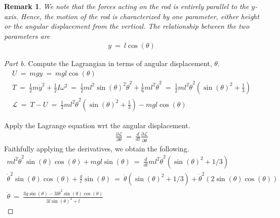\documentclass{article}
\numberwithin{equation}{section}
\newcommand{\deriv}[2]{
\frac {d {#1} } {d {#2}}
}
\newcommand{\pderiv}[2]{
\frac {\partial {#1} } {\partial {#2}}
}
\newtheorem{remark}{Remark}
\begin{document}
\begin{remark}
    We note that the forces acting on the rod is entirely parallel 
    to the $y$-axis. Hence, the motion of the rod is characterized 
    by one parameter, either height or the angular displacement from the vertical. 
    The relationship between the two parameters are 
    \begin{align}
        y \ = \ l \cos(\theta)
    \end{align}
\end{remark}

\begin{proof}[Part b]
    Compute the Lagrangian in terms of angular displacement, $\theta$. 
    \begin{align}
        U \ = \ mgy \ = \ mgl \cos(\theta) \\ 
        T \ = \ \frac 1 2 m \dot y^2 + \frac 1 2 I \omega^2 \ = \  
        \frac 1 2 m l^2 \sin(\theta)^2 \dot \theta^2 + \frac 1 6 m l^2 \dot\theta^2 
        \ = \ \frac 1 2 m l^2 \dot \theta^2 \left(
            \sin(\theta)^2 + \frac 1 3
        \right)\\\boxed{
        \mathcal L \ = \ T - U \ = \ 
        \frac 1 2 m l^2 \dot \theta^2 \left(
            \sin(\theta)^2 + \frac 1 3
        \right) - 
         mgl \cos(\theta)}
    \end{align}

    Apply the Lagrange equation wrt the angular displacement.  
    \begin{align}
        \pderiv {\mathcal L} {\theta} \ = \ \deriv{}{t} \pderiv{\mathcal L}{\dot \theta} 
    \end{align}
    Faithfully applying the derivatives, we obtain the following. 
    \begin{align}
        m l^2 \dot \theta^2 \sin(\theta) \cos(\theta) + mgl \sin(\theta) \ = \ \deriv{}{t} m l^2 \dot \theta^2 (\sin(\theta)^2 + 1/3) \\ 
        \dot \theta ^2 \sin(\theta) \cos(\theta) + \frac g l \sin(\theta) \ = \ \ddot \theta (\sin(\theta)^2 + 1/3) + \dot\theta^2 (2 \sin(\theta) \cos(\theta)) \\ 
        \boxed{\ddot \theta \ = \ \frac{3g \sin(\theta) - 3l\dot\theta^2 \sin(\theta)\cos(\theta)}{3l\sin(\theta)^2 + l}}
    \end{align}
\end{proof}
\end{document}

